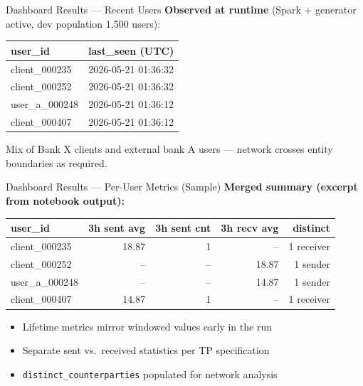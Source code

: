 \documentclass[aspectratio=169,11pt]{beamer}
\begin{document}
\begin{frame}{Dashboard Results — Recent Users}
  \textbf{Observed at runtime} (Spark + generator active, dev population 1,500 users):
  \begin{table}
    \centering
    \footnotesize
    \begin{tabular}{@{}lc@{}}
      \toprule
      \textbf{user\_id} & \textbf{last\_seen (UTC)} \\
      \midrule
      client\_000235 & 2026-05-21 01:36:32 \\
      client\_000252 & 2026-05-21 01:36:32 \\
      user\_a\_000248  & 2026-05-21 01:36:12 \\
      client\_000407 & 2026-05-21 01:36:12 \\
      \bottomrule
    \end{tabular}
  \end{table}
  \vspace{0.4em}
  Mix of Bank X clients and external bank A users — network crosses entity boundaries as required.
\end{frame}

\begin{frame}{Dashboard Results — Per-User Metrics (Sample)}
  \footnotesize
  \textbf{Merged summary (excerpt from notebook output):}
  \begin{table}
    \centering
    \begin{tabular}{@{}lrrrr@{}}
      \toprule
      \textbf{user\_id} & \textbf{3h sent avg} & \textbf{3h sent cnt} & \textbf{3h recv avg} & \textbf{distinct} \\
      \midrule
      client\_000235 & 18.87 & 1 & --   & 1 receiver \\
      client\_000252 & --    & -- & 18.87 & 1 sender \\
      user\_a\_000248  & --    & -- & 14.87 & 1 sender \\
      client\_000407 & 14.87 & 1 & --   & 1 receiver \\
      \bottomrule
    \end{tabular}
  \end{table}
  \vspace{0.3em}
  \normalsize
  \begin{itemize}
    \item Lifetime metrics mirror windowed values early in the run
    \item Separate sent vs.\ received statistics per TP specification
    \item \texttt{distinct\_counterparties} populated for network analysis
  \end{itemize}
\end{frame}
\end{document}
